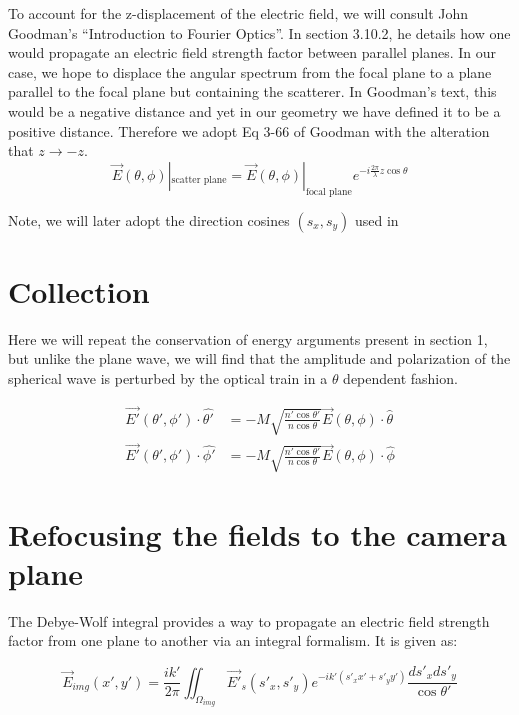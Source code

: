   To account for the z-displacement of the electric field, we will consult 
  John Goodman's ``Introduction to Fourier Optics''. In section 3.10.2, he 
  details
  how one would propagate an electric field strength factor between parallel
  planes. In our case, we hope to displace the 
  angular spectrum from the focal plane to a plane parallel to the focal plane
  but containing the scatterer. In Goodman's text\cite{goodman05}, this would be a negative
  distance and yet in our geometry we have defined it to be a positive distance.
  Therefore we adopt Eq 3-66 of Goodman with the alteration that  $z \rightarrow -z$.
  \begin{equation*}
    \vec{E}(\theta, \phi)|_{\text{scatter plane}} = \vec{E}(\theta, \phi)|_{\text{focal plane}} e^{-i\frac{2\pi}{\lambda}z\cos{\theta} }
  \end{equation*}

  Note, we will later adopt the direction cosines $(s_x, s_y)$ used in
  \section{Collection}
  Here we will repeat the conservation of energy arguments present in section
  1, but unlike the plane wave, we will find that the amplitude and 
  polarization of the spherical wave is perturbed by the optical train in a 
  $\theta$ dependent fashion. 

  \begin{equation*}
    \begin{split}
    \vec{E'}(\theta', \phi')\cdot\hat{\theta'} & = - M \sqrt{ \frac{n'\cos{\theta'}}{n\cos{\theta}}}\vec{E}(\theta, \phi)\cdot\hat{\theta}\\
    \vec{E'}(\theta', \phi')\cdot\hat{\phi'} & = - M \sqrt{ \frac{n'\cos{\theta'}}{n\cos{\theta}}}\vec{E}(\theta, \phi)\cdot\hat{\phi}
    \end{split}
  \end{equation*}

\section{Refocusing the fields to the camera plane}
  The Debye-Wolf integral provides a way to propagate an electric field strength
  factor from one plane to another via an integral formalism. It is given 
  as:

  \begin{equation*}
    \vec{E}_{img}(x', y') = \frac{i k'}{2 \pi} \iint_{\Omega_{img}} \vec{E'}_s(s'_x, s'_y) e^{-ik'(s'_xx'+s'_yy')}\frac{ds'_xds'_y}{\cos{\theta'}}
  \end{equation*}

